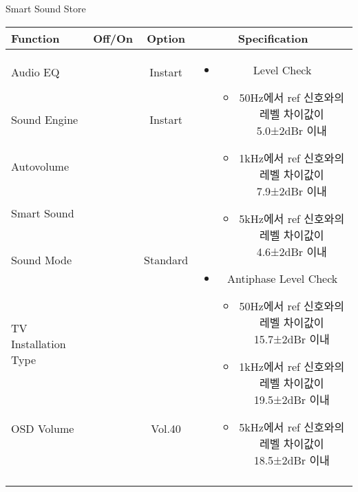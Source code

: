\begin{frame}[t]{Smart Sound Store}
\begin{tiny}
\begin{tabular}{@{}lccc@{}}
\toprule
Function & Off/On & Option & Specification \\
\midrule
Audio EQ & \color{black}{Off} & Instart &
\multirow{10}{60mm}{
\begin{itemize}
\item Level Check
	\begin{itemize}
	\item 50Hz에서 ref 신호와의 레벨 차이값이 5.0±2dBr 이내
	\item 1kHz에서 ref 신호와의 레벨 차이값이 7.9±2dBr 이내
	\item 5kHz에서 ref 신호와의 레벨 차이값이 4.6±2dBr 이내
	\end{itemize}
\item Antiphase Level Check
	\begin{itemize}
	\item 50Hz에서 ref 신호와의 레벨 차이값이 15.7±2dBr 이내
	\item 1kHz에서 ref 신호와의 레벨 차이값이 19.5±2dBr 이내
	\item 5kHz에서 ref 신호와의 레벨 차이값이 18.5±2dBr 이내
	\end{itemize}
\end{itemize}
} \\
Sound Engine & \color{blue}{On} & Instart & \\
Autovolume & \color{black}{Off} & & \\
Smart Sound & \color{blue}{On} & & \\
Sound Mode & \color{blue}{On} & Standard & \\
TV Installation Type & \color{blue}{On} & \color{black}{Standtype1} & \\
OSD Volume & \color{blue}{On} & Vol.40 & \\
& & & \\
& & & \\
& & & \\
& & & \\
\midrule
\end{tabular}
\end{tiny}

\end{frame}
